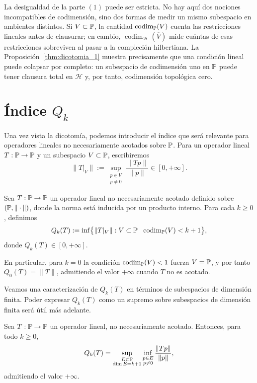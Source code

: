 \begin{rmk}
	La desigualdad de la parte $(1)$ puede ser estricta. No hay aquí dos nociones incompatibles de codimensión, sino dos formas de medir un mismo subespacio en ambientes distintos. Si $V\subset\mathbb{P}$, la cantidad $\operatorname{codim}_{\mathbb{P}}(V)$ cuenta las restricciones lineales antes de clausurar; en cambio, $\operatorname{codim}_{\mathcal H}(\overline V)$ mide cuántas de esas restricciones sobreviven al pasar a la compleción hilbertiana. La Proposición~\ref{thm:dicotomia_1} muestra precisamente que una condición lineal puede colapsar por completo: un subespacio de codimensión uno en $\mathbb{P}$ puede tener clausura total en $\mathcal H$ y, por tanto, codimensión topológica cero.
\end{rmk}

\section{Índice \texorpdfstring{$Q_k$}{Qk}}

Una vez vista la dicotomía, podemos introducir el índice que será relevante para operadores lineales no necesariamente acotados sobre $\mathbb{P}$. Para un operador lineal $T:\mathbb{P}\to\mathbb{P}$ y un subespacio $V\subset\mathbb{P}$, escribiremos
\[
	\|T|_V\|:=\sup_{\substack{p\in V\\ p\ne0}}\frac{\|Tp\|}{\|p\|}\in[0,+\infty].
\]

\begin{defn}\label{def:indice_Qk}
	Sea $T:\mathbb{P}\to\mathbb{P}$ un operador lineal no necesariamente acotado definido sobre $(\mathbb{P},\|\cdot\|)$, donde la norma está inducida por un producto interno. Para cada $k\ge0$, definimos
	\[
		Q_k(T)
		:=\inf\bigl\{\|T|_V\|:V\subset\Poly\ \ \operatorname{codim}_{\Poly}(V)<k+1\bigr\},
	\]
	donde $Q_k(T)\in [0,+\infty]$.
\end{defn}

\begin{rmk}
	En particular, para $k=0$ la condición $\operatorname{codim}_{\mathbb{P}}(V)<1$ fuerza $V=\mathbb{P}$, y por tanto $Q_0(T)=\|T\|$,
	admitiendo el valor $+\infty$ cuando $T$ no es acotado.
\end{rmk}

Veamos una caracterización de $Q_k(T)$ en términos de subespacios de dimensión finita. Poder expresar $Q_k(T)$ como un supremo sobre subespacios de dimensión finita será útil más adelante.

\begin{thm}\label{thm:maxmin_Qk}
	Sea $T:\mathbb{P}\to\mathbb{P}$ un operador lineal, no necesariamente acotado. Entonces, para todo $k\ge0$,
	\[
		Q_k(T)
		=
		\sup_{\substack{E\subset\mathbb{P}\\ \dim E=k+1}}
		\inf_{\substack{p\in E\\ p\ne0}}
		\frac{\|Tp\|}{\|p\|},
	\]
	admitiendo el valor $+\infty$.
\end{thm}

